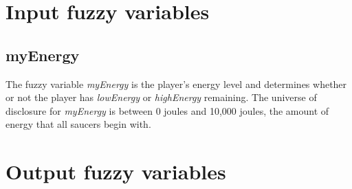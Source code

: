 \section{Input fuzzy variables}

\subsection{myEnergy}

The fuzzy variable \emph{myEnergy} is the player's energy level and determines whether or not the player has \emph{lowEnergy} or \emph{highEnergy} remaining. The universe of disclosure for \emph{myEnergy} is between 0 joules and 10,000 joules, the amount of energy that all saucers begin with.



\section{Output fuzzy variables}

